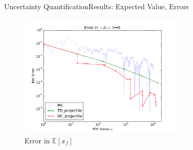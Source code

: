 \documentclass{beamer}
\newcommand{\expv}[1]{\ensuremath{\mathbb{E}[ #1]}}
\begin{document}
\begin{frame}{Uncertainty Quantification}{Results: Expected Value, Errors}
  \begin{figure}[h!]
    \centering
      \includegraphics[width=0.7\textwidth]{../graphics/projectile_errs}
      \caption{Error in $\expv{x_f}$}
  \end{figure}
\end{frame}

%
\end{document}

